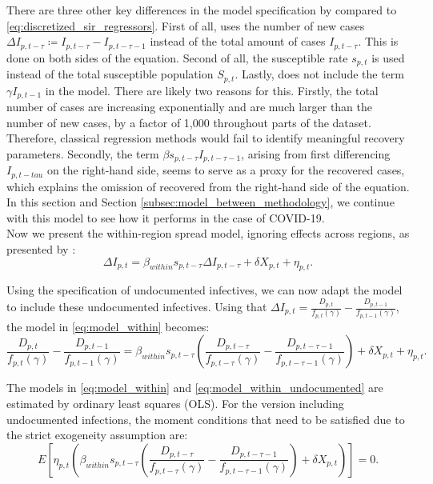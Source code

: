 \documentclass[12pt]{article}
\begin{document}
	There are three other key differences in the model specification by \textcite{adda2016economic} compared to \eqref{eq:discretized_sir_regressors}. First of all, \textcite{adda2016economic} uses the number of new cases $\Delta I_{p,t-\tau} \coloneqq I_{p,t-\tau} - I_{p,t-\tau-1}$ instead of the total amount of cases $I_{p,t-\tau}$. This is done on both sides of the equation. Second of all, the susceptible rate $s_{p,t}$ is used instead of the total susceptible population $S_{p,t}$. Lastly, \textcite{adda2016economic} does not include the term $\gamma I_{p,t-1}$ in the model. There are likely two reasons for this. Firstly, the total number of cases are increasing exponentially and are much larger than the number of new cases, by a factor of 1,000 throughout parts of the dataset. Therefore, classical regression methods would fail to identify meaningful recovery parameters. Secondly, the term $\beta s_{p,t-\tau} I_{p,t-\tau-1}$, arising from first differencing $I_{p,t-tau}$ on the right-hand side, seems to serve as a proxy for the recovered cases, which explains the omission of recovered from the right-hand side of the equation. In this section and Section \ref{subsec:model_between_methodology}, we continue with this model to see how it performs in the case of COVID-19. \\
	
	Now we present the within-region spread model, ignoring effects across regions, as presented by \textcite{adda2016economic}:
	\begin{equation} \label{eq:model_within}
	    \Delta I_{p,t} = \beta_{within} s_{p,t-\tau} \Delta I_{p,t-\tau} + \delta X_{p,t} + \eta_{p,t}.
	\end{equation}
	
	Using the specification of undocumented infectives, we can now adapt the model to include these undocumented infectives. Using that $\Delta I_{p,t} = \frac{D_{p,t}}{f_{p,t}(\gamma)} - \frac{D_{p,t-1}}{f_{p,t-1}(\gamma)}$, the model in \eqref{eq:model_within} becomes:
	    \begin{equation} \label{eq:model_within_undocumented}
		    \frac{D_{p,t}}{f_{p,t}(\gamma)} - \frac{D_{p,t-1}}{f_{p,t-1}(\gamma)} = \beta_{within}s_{p,t-\tau}\left(\frac{D_{p,t-\tau}}{f_{p,t-\tau}(\gamma)} - \frac{D_{p,t-\tau-1}}{f_{p,t-\tau-1}(\gamma)}\right) + \delta X_{p,t} + \eta_{p,t}.
	    \end{equation}
	
	The models in \eqref{eq:model_within} and \eqref{eq:model_within_undocumented} are estimated by ordinary least squares (OLS). For the version including undocumented infections, the moment conditions that need to be satisfied due to the strict exogeneity assumption are:
	    \[E\left[ \eta_{p,t} \left( \beta_{within}s_{p,t-\tau}\left(\frac{D_{p,t-\tau}}{f_{p,t-\tau}(\gamma)} - \frac{D_{p,t-\tau-1}}{f_{p,t-\tau-1}(\gamma)}\right) + \delta X_{p,t} \right) \right] = 0.\]
	
\end{document}
